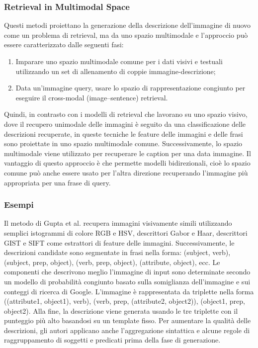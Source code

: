 \subsubsection{Retrieval in Multimodal Space}
Questi metodi proiettano la generazione della descrizione dell'immagine di nuovo come un problema di retrieval, ma da uno spazio multimodale e l'approccio può essere caratterizzato dalle seguenti fasi:
\begin{enumerate}
\item Imparare uno spazio multimodale comune per i dati visivi e testuali utilizzando un set di allenamento di coppie immagine-descrizione;
\item Data un'immagine query, usare lo spazio di rappresentazione congiunto per eseguire il cross-modal (image–sentence) retrieval.
\end{enumerate}
Quindi, in contrasto con i modelli di retrieval che lavorano su uno spazio visivo, dove il recupero unimodale delle immagini è seguito da una classificazione delle descrizioni recuperate, in queste tecniche le feature delle immagini e delle frasi sono proiettate in uno spazio multimodale comune. Successivamente, lo spazio multimodale viene utilizzato per recuperare le caption per una data immagine. Il vantaggio di questo approccio è che permette modelli bidirezionali, cioè lo spazio comune può anche essere usato per l'altra direzione recuperando l'immagine più appropriata per una frase di query.

\subsubsection{Esempi}

Il metodo di Gupta et al. \cite{gupta2012choosing} recupera immagini visivamente simili utilizzando semplici istogrammi di colore RGB e HSV, descrittori Gabor e Haar, descrittori GIST e SIFT come estrattori di feature delle immagini. Successivamente, le descrizioni candidate sono segmentate in frasi nella forma: (subject, verb), (subject, prep, object), (verb, prep, object), (attribute, object), ecc. Le componenti che descrivono meglio l'immagine di input sono determinate secondo un modello di probabilità congiunto basato sulla somiglianza dell'immagine e sui conteggi di ricerca di Google. L'immagine è rappresentata da triplette nella forma {((attribute1, object1), verb), (verb, prep, (attribute2, object2)), (object1, prep, object2)}. Alla fine, la descrizione viene generata usando le tre triplette con il punteggio più alto basandosi su un template fisso. Per aumentare la qualità delle descrizioni, gli autori applicano anche l'aggregazione sintattica e alcune regole di raggruppamento di soggetti e predicati prima della fase di generazione.

